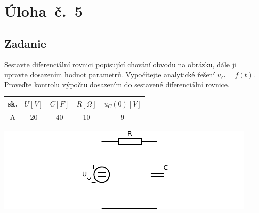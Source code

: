 \section{Úloha~č.~5}
\subsection{Zadanie}
Sestavte diferenciální rovnici popisující chování obvodu na obrázku, dále ji
upravte dosazením hodnot parametrů. Vypočítejte analytické řešení $u_{C} = f (t)$.
Proveďte kontrolu výpočtu dosazením do sestavené diferenciální rovnice.

\begin{table}[H]
\begin{center}
  \begin{tabular}{|c|c|c|c|c|}
    \hline
    sk. &  $U [V]$ & $C [F]$ & $R [\Omega]$ & $u_{C}(0) [V]$ \\ \hline
    A & 20 & 40 & 10 & 9 \\ \hline
  \end{tabular}
\end{center}
\end{table}
\begin{center}
  \includegraphics[width=0.8\columnwidth,keepaspectratio]{res/u5o1}
\end{center}
